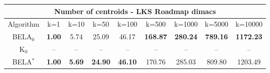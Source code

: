 \begin{tabular}{c|cccccccc}\toprule
\multicolumn{9}{c}{Number of centroids - LKS Roadmap dimacs}\\ \midrule
Algorithm & k=1 & k=10 & k=50 & k=100 & k=500 & k=1000 & k=5000 & k=10000 \\ \midrule
BELA$_0$ & \textbf{1.00} & 5.74 & 25.09 & 46.17 & \textbf{168.87} & \textbf{280.24} & \textbf{789.16} & \textbf{1172.23} \\
K$_0$ & -- & -- & -- & -- & -- & -- & -- & -- \\
BELA$^*$ & \textbf{1.00} & \textbf{5.69} & \textbf{24.90} & \textbf{46.10} & 170.76 & 285.03 & 809.80 & 1203.49 \\ \bottomrule 
\end{tabular}
